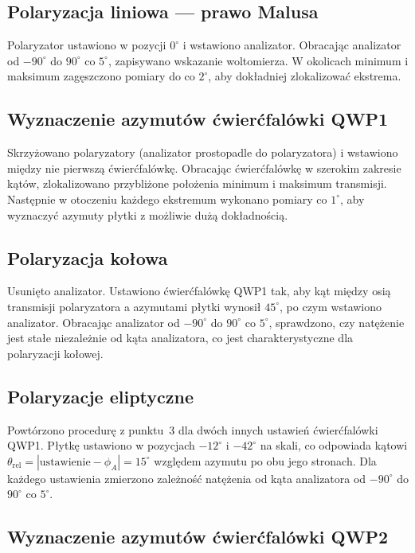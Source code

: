 \documentclass[12pt, a4paper]{article}
\begin{document}
\subsection{Polaryzacja liniowa --- prawo Malusa}

Polaryzator ustawiono w pozycji $0^{\circ}$ i wstawiono analizator. Obracając
analizator od $-90^{\circ}$ do $90^{\circ}$ co $5^{\circ}$, zapisywano wskazanie
woltomierza. W okolicach minimum i maksimum zagęszczono pomiary do co $2^{\circ}$,
aby dokładniej zlokalizować ekstrema.

\subsection{Wyznaczenie azymutów ćwierćfalówki QWP1}

Skrzyżowano polaryzatory (analizator prostopadle do polaryzatora) i wstawiono
między nie pierwszą ćwierćfalówkę. Obracając ćwierćfalówkę w szerokim zakresie
kątów, zlokalizowano przybliżone położenia minimum i maksimum transmisji.
Następnie w otoczeniu każdego ekstremum wykonano pomiary co $1^{\circ}$,
aby wyznaczyć azymuty płytki z możliwie dużą dokładnością.

\subsection{Polaryzacja kołowa}

Usunięto analizator. Ustawiono ćwierćfalówkę QWP1 tak, aby kąt między osią
transmisji polaryzatora a azymutami płytki wynosił $45^{\circ}$, po czym
wstawiono analizator. Obracając analizator od $-90^{\circ}$ do $90^{\circ}$
co $5^{\circ}$, sprawdzono, czy natężenie jest stałe niezależnie od kąta
analizatora, co jest charakterystyczne dla polaryzacji kołowej.

\subsection{Polaryzacje eliptyczne}

Powtórzono procedurę z punktu~3 dla dwóch innych ustawień ćwierćfalówki QWP1.
Płytkę ustawiono w pozycjach $-12^{\circ}$ i $-42^{\circ}$ na skali,
co odpowiada kątowi $\theta_\text{rel} = |\text{ustawienie} - \phi_A| = 15^{\circ}$
względem azymutu po obu jego stronach. Dla każdego ustawienia zmierzono
zależność natężenia od kąta analizatora od $-90^{\circ}$ do $90^{\circ}$
co $5^{\circ}$.

\subsection{Wyznaczenie azymutów ćwierćfalówki QWP2}
\end{document}
